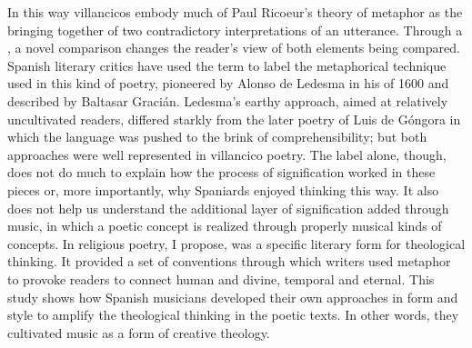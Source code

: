 In this way villancicos embody much of Paul Ricoeur's theory of metaphor as the
bringing together of two contradictory interpretations of an utterance.
Through a , a novel comparison changes the reader's
view of both elements being compared.%
    \Autocite{Ricoeur:InterpretationTheory}
Spanish literary critics have used the term  to label the
metaphorical technique used in this kind of poetry, pioneered by Alonso de
Ledesma in his  of 1600 and described by
Baltasar Gracián.%
   \Autocites
   {Gracian:Ingenio}
   [227--228]{Gaylord:Poetry}
   {Valbuena:Literatura}
   [447--448]{Torrente:VC-chapter}
Ledesma's earthy approach, aimed at relatively uncultivated readers, differed
starkly from the later poetry of Luis de Góngora in which the language was
pushed to the brink of comprehensibility; but both approaches were well
represented in villancico poetry.%
    \Autocites{Tenorio:Gongorismo}
The label  alone, though, does not do much to explain how the
process of signification worked in these pieces or, more importantly, why
Spaniards enjoyed thinking this way.
It also does not help us understand the additional layer of signification added
through music, in which a poetic concept is realized through properly musical
kinds of concepts.
In religious poetry, I propose,  was a specific literary form
for theological thinking.
It provided a set of conventions through which writers used metaphor to provoke
readers to connect human and divine, temporal and eternal.
This study shows how Spanish musicians developed their own approaches in form
and style to amplify the theological thinking in the poetic texts. 
In other words, they cultivated music as a form of creative theology.


